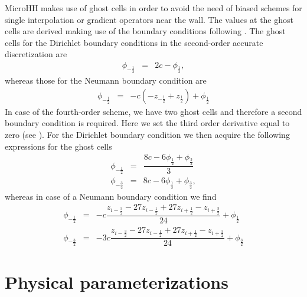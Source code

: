 \documentclass[gmd]{copernicus}
\begin{document}
MicroHH makes use of ghost cells in order to avoid the need of biased schemes for single interpolation or gradient operators near the wall. The values at the ghost cells are derived making use of the boundary conditions following \citet{Morinishi1998}. The ghost cells for the Dirichlet boundary conditions in the second-order accurate discretization are
\begin{eqnarray}
\phi_{-\frac{1}{2}} & = & 2 c - \phi_{\frac{1}{2}},
\end{eqnarray}
whereas those for the Neumann boundary condition are
\begin{eqnarray}
\phi_{-\frac{1}{2}} & = & -c \left( - z_{-\frac{1}{2}} + z_{\frac{1}{2}} \right) + \phi_{\frac{1}{2}}
\end{eqnarray}
In case of the fourth-order scheme, we have two ghost cells and therefore a second boundary condition is required. Here we set the third order derivative equal to zero (see \citet{Morinishi1998}). For the Dirichlet boundary condition we then acquire the following expressions for the ghost cells
\begin{eqnarray}
\phi_{-\frac{1}{2}} & = & \dfrac{8 c - 6 \phi_{\frac{1}{2}} + \phi_{\frac{3}{2}}}{3} \\
\phi_{-\frac{3}{2}} & = & 8 c - 6 \phi_{\frac{1}{2}} + \phi_{\frac{3}{2}},
\end{eqnarray}
whereas in case of a Neumann boundary condition we find
\begin{eqnarray}
\phi_{-\frac{1}{2}} & = & -c  \dfrac{z_{i-\frac{3}{2}} - 27 z_{i-\frac{1}{2}} + 27 z_{i+\frac{1}{2}} - z_{i+\frac{3}{2}}}{24} + \phi_{\frac{1}{2}} \\
\phi_{-\frac{3}{2}} & = & -3c \dfrac{z_{i-\frac{3}{2}} - 27 z_{i-\frac{1}{2}} + 27 z_{i+\frac{1}{2}} - z_{i+\frac{3}{2}}}{24} + \phi_{\frac{3}{2}}
\end{eqnarray}

\section{Physical parameterizations}\label{sec:parametrizations}
\end{document}
